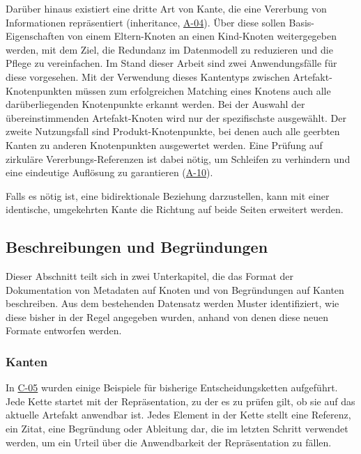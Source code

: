 Darüber hinaus existiert eine dritte Art von Kante, die eine Vererbung von Informationen repräsentiert (inheritance, \hyperref[subsec:req-selektor-inheritance]{A-04}).
Über diese sollen Basis-Eigenschaften von einem Eltern-Knoten an einen Kind-Knoten weitergegeben werden, mit dem Ziel, die Redundanz im Datenmodell zu reduzieren und die Pflege zu vereinfachen.
Im Stand dieser Arbeit sind zwei Anwendungsfälle für diese vorgesehen.
Mit der Verwendung dieses Kantentyps zwischen Artefakt-Knotenpunkten müssen zum erfolgreichen Matching eines Knotens auch alle darüberliegenden Knotenpunkte erkannt werden.
Bei der Auswahl der übereinstimmenden Artefakt-Knoten wird nur der spezifischste ausgewählt.
Der zweite Nutzungsfall sind Produkt-Knotenpunkte, bei denen auch alle geerbten Kanten zu anderen Knotenpunkten ausgewertet werden.
Eine Prüfung auf zirkuläre Vererbungs-Referenzen ist dabei nötig, um Schleifen zu verhindern und eine eindeutige Auflösung zu garantieren (\hyperref[subsec:req-graph-inner-consistency]{A-10}).

Falls es nötig ist, eine bidirektionale Beziehung darzustellen, kann mit einer identische, umgekehrten Kante die Richtung auf beide Seiten erweitert werden.

\subsection{Beschreibungen und Begründungen}\label{subsec:model-rationale}

Dieser Abschnitt teilt sich in zwei Unterkapitel, die das Format der Dokumentation von Metadaten auf Knoten und von Begründungen auf Kanten beschreiben.
Aus dem bestehenden Datensatz werden Muster identifiziert, wie diese bisher in der Regel angegeben wurden, anhand von denen diese neuen Formate entworfen werden.

\subsubsection{Kanten}

In \hyperref[subsec:c-05-reason-not-good-enough]{C-05} wurden einige Beispiele für bisherige Entscheidungsketten aufgeführt.
Jede Kette startet mit der Repräsentation, zu der es zu prüfen gilt, ob sie auf das aktuelle Artefakt anwendbar ist.
Jedes Element in der Kette stellt eine Referenz, ein Zitat, eine Begründung oder Ableitung dar, die im letzten Schritt verwendet werden, um ein Urteil über die Anwendbarkeit der Repräsentation zu fällen.

